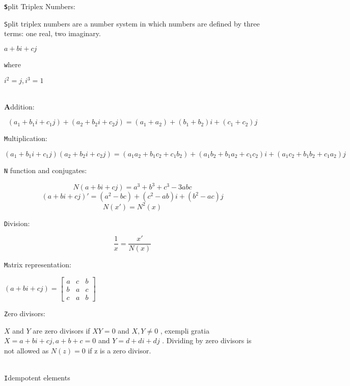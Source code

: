 \documentclass[a4paper]{article}
\begin{document}
\begin{ttfamily}
\textbf \texttt Split Triplex Numbers: \\
\end{ttfamily}
\begin{ttfamily}
\texttt Split triplex numbers are a number system in which numbers are defined by three terms: one real, two imaginary.
\end{ttfamily}
$ a+bi+cj $
\begin{ttfamily}
\texttt where
\end{ttfamily}
$ i^{2}=j,i^{3}=1 $
\\ \\
\begin{ttfamily}
\textbf  Addition:
\end{ttfamily}
\[ (a_{1}+b_{1}i+c_{1}j)+(a_{2}+b_{2}i+c_{2}j) = (a_{1}+a_{2})+(b_{1}+b_{2})i+(c_{1}+c_{2})j \]
\begin{ttfamily}
\texttt Multiplication:
\end{ttfamily}
\[ (a_{1}+b_{1}i+c_{1}j)(a_{2}+b_{2}i+c_{2}j) = (a_{1}a_{2}+b_{1}c_{2}+c_{1}b_{2})+(a_{1}b_{2}+b_{1}a_{2}+c_{1}c_{2})i+(a_{1}c_{2}+b_{1}b_{2}+c_{1}a_{2})j \]
\begin{ttfamily}
\texttt N function and conjugates:
\end{ttfamily}
\[ N(a+bi+cj)=a^{3}+b^{3}+c^{3}-3abc \]
\[ (a+bi+cj)'=(a^{2}-bc)+(c^{2}-ab)i+(b^{2}-ac)j \]
\[ N(x')=N^{2}(x) \]
\begin{ttfamily}
\texttt Division:
\end{ttfamily}
\[ \frac{1}{x}=\frac{x'}{N(x)} \]
\begin{ttfamily}
\texttt Matrix representation:
\end{ttfamily}
$ (a+bi+cj)= \begin{bmatrix}
a & c & b \\
b & a & c \\
c & a & b
\end{bmatrix} $ \\
\begin{ttfamily}
\texttt Zero divisors: \\
\end{ttfamily}
$ X $ and $ Y $ are zero divisors if $ XY=0 $ and $ X,Y\neq 0 $ , exempli gratia $ X = a+bi+cj, a+b+c=0 $ and $ Y = d+di+dj $ . Dividing by zero divisors is not allowed as $ N(z) = 0 $ if z is a zero divisor.
\\ \\
\begin{ttfamily}
\texttt Idempotent elements
\end{ttfamily}
\end{document}
